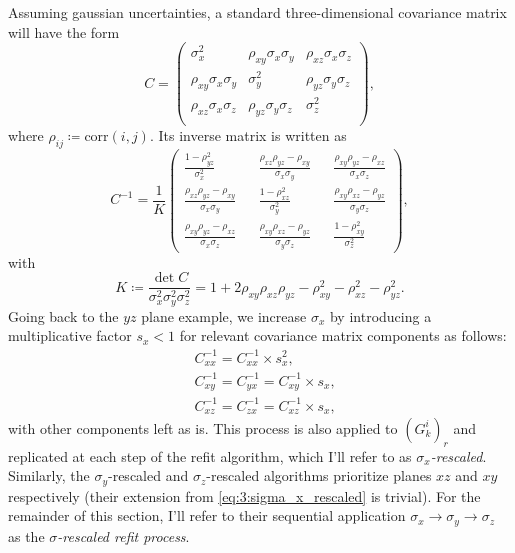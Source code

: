 Assuming gaussian uncertainties, a standard three-dimensional covariance matrix will have the form
\begin{equation}
C = \begin{pmatrix}
	\sigma_x^2 & \rho_{xy} \sigma_x \sigma_y & \rho_{xz} \sigma_x \sigma_z \\
	\rho_{xy} \sigma_x \sigma_y & \sigma_y^2 & \rho_{yz} \sigma_y \sigma_z \\
	\rho_{xz} \sigma_x \sigma_z & \rho_{yz} \sigma_y \sigma_z & \sigma_z^2 \\
\end{pmatrix},
\label{eq:3:gaussian_covmatrix}
\end{equation}
where $\rho_{ij} \coloneqq \text{corr}(i,j)$. Its inverse matrix is written as
\begin{equation}
C^{-1} = \frac{1}{K} \begin{pmatrix}
\frac{1-\rho_{yz}^2}{\sigma_x^2} &&
\frac{\rho_{xz}\rho_{yz} - \rho_{xy}}{\sigma_x \sigma_y} &&
\frac{\rho_{xy}\rho_{yz} - \rho_{xz}}{\sigma_x \sigma_z} \\
\frac{\rho_{xz}\rho_{yz} - \rho_{xy}}{\sigma_x \sigma_y} &&
\frac{1-\rho_{xz}^2}{\sigma_y^2} &&
\frac{\rho_{xy}\rho_{xz} - \rho_{yz}}{\sigma_y \sigma_z} \\
\frac{\rho_{xy}\rho_{yz} - \rho_{xz}}{\sigma_x \sigma_z} &&
\frac{\rho_{xy}\rho_{xz} - \rho_{yz}}{\sigma_y \sigma_z} &&
\frac{1-\rho_{xy}^2}{\sigma_z^2}
\end{pmatrix},
\label{eq:3:inverse_gaussian_covmatrix}
\end{equation}
with
\begin{equation}
K \coloneqq \frac{\det C}{\sigma_x^2 \sigma_y^2 \sigma_z^2} = 1+2\rho_{xy} \rho_{xz} \rho_{yz} - \rho_{xy}^2 - \rho_{xz}^2 - \rho_{yz}^2.
\end{equation}
Going back to the $yz$ plane example, we increase $\sigma_x$ by introducing a multiplicative factor $s_x < 1$ for relevant covariance matrix components as follows:
\begin{equation}
\begin{aligned}
&C^{-1}_{xx} = C^{-1}_{xx} \times s_x^2, \\
&C^{-1}_{xy} = C^{-1}_{yx} = C^{-1}_{xy} \times s_x, \\
&C^{-1}_{xz} = C^{-1}_{zx} = C^{-1}_{xz} \times s_x,
\end{aligned}
\label{eq:3:sigma_x_rescaled}
\end{equation}
with other components left as is.
This process is also applied to ${(G_k^i)}_r$ and replicated at each step of the refit algorithm, which I'll refer to as \textit{$\sigma_x$-rescaled}.
Similarly, the $\sigma_y$-rescaled and $\sigma_z$-rescaled algorithms prioritize planes $xz$ and $xy$ respectively (their extension from \eqref{eq:3:sigma_x_rescaled} is trivial).
For the remainder of this section, I'll refer to their sequential application $\sigma_x \rightarrow \sigma_y \rightarrow \sigma_z$ as the \textit{$\sigma$-rescaled refit process}.

